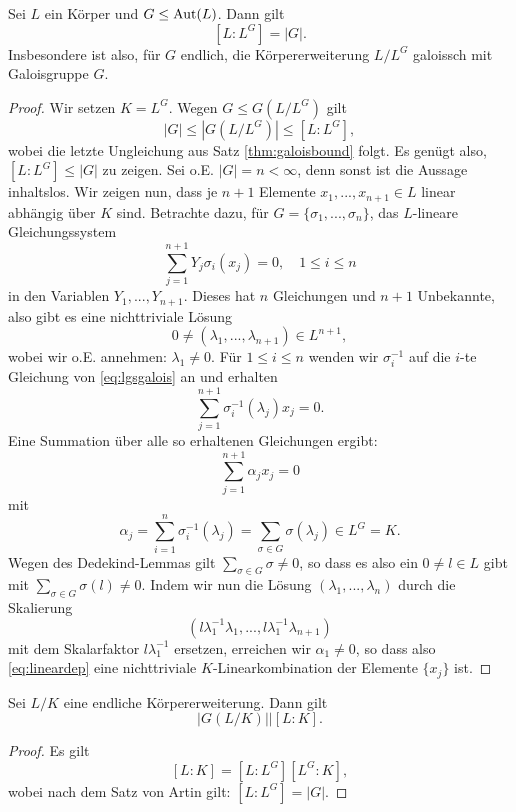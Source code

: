 \documentclass{book}
\begin{document}
\begin{thm}[Artin]
    \label{thm:artin} Sei $L$ ein Körper und $G \le \operatorname{Aut}(L)$. Dann gilt
    \[
        [L:L^G] = |G|.
    \]
    Insbesondere ist also, für $G$ endlich, die Körpererweiterung $L/L^G$
    galoissch mit Galoisgruppe $G$.  
\end{thm}
\begin{proof}
    Wir setzen $K = L^G$. Wegen $G \le G(L/L^G)$ gilt
    \[
        |G| \le |G(L/L^G)| \le [L:L^G],
    \]
    wobei die letzte Ungleichung aus Satz \ref{thm:galoisbound} folgt. Es
    genügt also, $[L:L^G] \le |G|$ zu zeigen. Sei o.E. $|G| = n < \infty$, denn
    sonst ist die Aussage inhaltslos. Wir zeigen nun, dass je $n+1$ Elemente
    $x_1, ..., x_{n+1} \in L$ linear abhängig über $K$ sind. Betrachte dazu,
    für $G = \{\sigma_1, ..., \sigma_n\}$, das $L$-lineare Gleichungssystem
    \begin{equation}
        \label{eq:lgsgalois}
        \sum_{j=1}^{n+1} Y_j \sigma_i(x_j) = 0, \quad 1 \le i \le n
    \end{equation}
    in den Variablen $Y_1, ..., Y_{n+1}$. Dieses hat $n$ Gleichungen und $n+1$ Unbekannte, also gibt es eine nichttriviale Lösung
    \[
        0 \ne (\lambda_1, ..., \lambda_{n+1}) \in L^{n+1},
    \]
    wobei wir o.E. annehmen: $\lambda_1 \ne 0$. Für $1 \le i \le n$ wenden wir
    $\sigma_i^{-1}$ auf die $i$-te Gleichung von \eqref{eq:lgsgalois} an und
    erhalten
    \[
        \sum_{j=1}^{n+1} \sigma_i^{-1}(\lambda_j) x_j = 0.
    \]
    Eine Summation über alle so erhaltenen Gleichungen ergibt:
    \begin{equation}
        \label{eq:lineardep}
        \sum_{j=1}^{n+1} \alpha_j x_j = 0
    \end{equation}
    mit 
    \[
        \alpha_j = \sum_{i=1}^{n} \sigma_i^{-1}(\lambda_j) = \sum_{\sigma \in G} \sigma(\lambda_j) \in L^G = K.
    \]
    Wegen des Dedekind-Lemmas gilt $\sum_{\sigma \in G} \sigma \ne 0$, so dass
    es also ein $0 \ne l \in L$ gibt mit $\sum_{\sigma \in G}\sigma(l) \ne 0$.
    Indem wir nun die Lösung $(\lambda_1, ..., \lambda_n)$ durch die Skalierung 
    \[
        (l\lambda_1^{-1} \lambda_1, ..., l\lambda_1^{-1} \lambda_{n+1})
    \]
    mit dem Skalarfaktor $l\lambda_1^{-1}$ ersetzen, erreichen wir $\alpha_1
    \ne 0$, so dass also \eqref{eq:lineardep} eine nichttriviale
    $K$-Linearkombination der Elemente $\{x_j\}$ ist. 
\end{proof}

\begin{cor}
    \label{cor:galdivides}
    Sei $L/K$ eine endliche Körpererweiterung. Dann gilt
    \[
        |G(L/K)| | [L:K].
    \]
\end{cor}
\begin{proof}
    Es gilt
    \[
        [L:K] = [L : L^G] [L^G:K],
    \]
    wobei nach dem Satz von Artin gilt: $[L:L^G] = |G|$. 
\end{proof}
\end{document}
